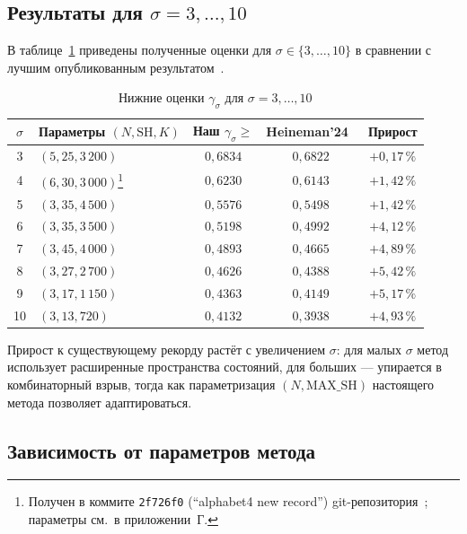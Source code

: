 \subsection{Результаты для $\sigma = 3, \ldots, 10$}

В таблице~\ref{tab:large-sigma} приведены полученные оценки для $\sigma \in \{3, \ldots, 10\}$ в сравнении с лучшим опубликованным результатом~\cite{heineman2024}.

\begin{table}[h!]
\caption{Нижние оценки $\gamma_\sigma$ для $\sigma = 3, \ldots, 10$}
\label{tab:large-sigma}
\centering
\small
\begin{tabular}{|c|l|c|c|c|}
\hline
$\sigma$ & Параметры $(N, \mathrm{SH}, K)$ & Наш $\gamma_\sigma \geq$ & Heineman'24~\cite{heineman2024} & Прирост \\
\hline
3   & $(5, 25, 3\,200)$  & $0{,}6834$ & $0{,}6822$ & $+0{,}17\,\%$ \\
4   & $(6, 30, 3\,000)$\footnote{Получен в коммите \texttt{2f726f0} (``alphabet4 new record'') git-репозитория~\cite{ourgithub}; параметры см.\ в приложении~Г.} & $0{,}6230$ & $0{,}6143$ & $+1{,}42\,\%$ \\
5   & $(3, 35, 4\,500)$  & $0{,}5576$ & $0{,}5498$ & $+1{,}42\,\%$ \\
6   & $(3, 35, 3\,500)$  & $0{,}5198$ & $0{,}4992$ & $+4{,}12\,\%$ \\
7   & $(3, 45, 4\,000)$  & $0{,}4893$ & $0{,}4665$ & $+4{,}89\,\%$ \\
8   & $(3, 27, 2\,700)$  & $0{,}4626$ & $0{,}4388$ & $+5{,}42\,\%$ \\
9   & $(3, 17, 1\,150)$  & $0{,}4363$ & $0{,}4149$ & $+5{,}17\,\%$ \\
10  & $(3, 13, 720)$     & $0{,}4132$ & $0{,}3938$ & $+4{,}93\,\%$ \\
\hline
\end{tabular}
\end{table}

Прирост к существующему рекорду растёт с увеличением $\sigma$: для малых $\sigma$ метод~\cite{heineman2024} использует расширенные пространства состояний, для больших --- упирается в комбинаторный взрыв, тогда как параметризация $(N, \mathrm{MAX\_SH})$ настоящего метода позволяет адаптироваться.

\subsection{Зависимость от параметров метода}

